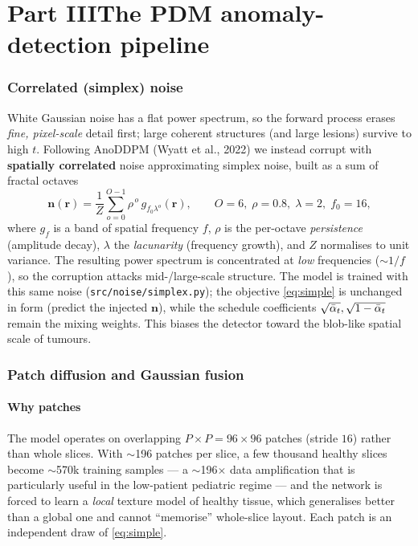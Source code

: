 \part*{Part III\quad The PDM anomaly-detection pipeline}
\label{part:pdm}

\section{Correlated (simplex) noise}
White Gaussian noise has a flat power spectrum, so the forward process erases
\emph{fine, pixel-scale} detail first; large coherent structures (and large
lesions) survive to high $t$. Following AnoDDPM (Wyatt et al., 2022) we instead
corrupt with \textbf{spatially correlated} noise approximating simplex noise,
built as a sum of fractal octaves
\begin{equation}
\bm n(\bm r)=\frac{1}{Z}\sum_{o=0}^{O-1} \rho^{\,o}\,g_{f_0\lambda^{o}}(\bm r),
\qquad O=6,\;\rho=0.8,\;\lambda=2,\;f_0=16,
\label{eq:simplex}
\end{equation}
where $g_{f}$ is a band of spatial frequency $f$, $\rho$ is the per-octave
\emph{persistence} (amplitude decay), $\lambda$ the \emph{lacunarity} (frequency
growth), and $Z$ normalises to unit variance. The resulting power spectrum is
concentrated at \emph{low} frequencies ($\sim 1/f$), so the corruption attacks
mid-/large-scale structure. The model is trained with this same noise
(\texttt{src/noise/simplex.py}); the objective \eqref{eq:simple} is unchanged in
form (predict the injected $\bm n$), while the schedule coefficients
$\sqrt{\bar{\alpha}_t},\sqrt{1-\bar{\alpha}_t}$ remain the mixing weights. This biases the
detector toward the blob-like spatial scale of tumours.

\section{Patch diffusion and Gaussian fusion}
\subsection{Why patches}
The model operates on overlapping $P\times P=96\times96$ patches (stride $16$)
rather than whole slices. With $\sim$196 patches per slice, a few thousand
healthy slices become $\sim$570k training samples --- a $\sim$196$\times$ data
amplification that is particularly useful in the low-patient pediatric regime --- and the
network is forced to learn a \emph{local} texture model of healthy tissue, which
generalises better than a global one and cannot ``memorise'' whole-slice layout.
Each patch is an independent draw of \eqref{eq:simple}.

